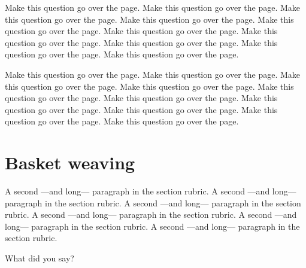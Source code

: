 \documentclass[rough,answers]{UoYClosedExam}
\begin{document}
\begin{question}{25}
Make this question go over the page.  Make this question go over the
page.  Make this question go over the page.  Make this question go
over the page.  Make this question go over the page.  Make this
question go over the page.  Make this question go over the page.  Make
this question go over the page.  Make this question go over the page.
Make this question go over the page.

Make this question go over the page.  Make this question go over the
page.  Make this question go over the page.  Make this question go
over the page.  Make this question go over the page.  Make this
question go over the page.  Make this question go over the page.  Make
this question go over the page.  Make this question go over the page.
Make this question go over the page.
\end{question}

\section{Basket weaving}{\SeparateAnswerBook

A second ---and long--- paragraph in the section rubric.  A second
---and long--- paragraph in the section rubric.  A second ---and
long--- paragraph in the section rubric.  A second ---and long---
paragraph in the section rubric.  A second ---and long--- paragraph in
the section rubric.  A second ---and long--- paragraph in the section
rubric.
}\label{BW:Sec}

\begin{question}{25}{}
What did you say?
\end{question}

\end{document}
